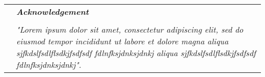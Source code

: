 \vspace*{\fill}
\begin{flushright}

\begin{tabular}{p{6cm}p{6cm}}
    & \textit{\textbf{Acknowledgement}}\\
    & \\
    & \textit{"Lorem ipsum dolor sit amet, consectetur adipiscing elit, sed do eiusmod tempor incididunt ut labore et dolore magna aliqua sjfkdslfsdlflsdkjfsdfsdf fdlnfksjdnksjdnkj aliqua sjfkdslfsdlflsdkjfsdfsdf fdlnfksjdnksjdnkj".}

\end{tabular}
\end{flushright}
\newpage
